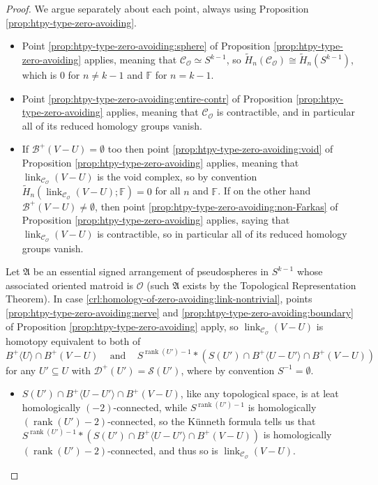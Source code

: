 \documentclass[a4paper,11pt,reqno, english]{amsart}
\theoremstyle{definition}
\theoremstyle{remark}
\DeclareMathOperator{\link}{\mathrm{link}}
\begin{document}
\begin{proof}
    We argue separately about each point, always using Proposition \ref{prop:htpy-type-zero-avoiding}.
    \begin{itemize}
        \item[\ref{crl:homology-of-zero-avoiding:complex-sphere}] Point \ref{prop:htpy-type-zero-avoiding:sphere} of Proposition \ref{prop:htpy-type-zero-avoiding} applies, meaning that $\mathscr{C}_\mathscr{O}\simeq S^{k-1}$, so $\tilde{H}_n(\mathscr{C}_\mathscr{O})\cong\tilde{H}_n(S^{k-1})$, which is $0$ for $n\neq k-1$ and $\mathbb{F}$ for $n=k-1$.
        \item[\ref{crl:homology-of-zero-avoiding:complex-pt}] Point \ref{prop:htpy-type-zero-avoiding:entire-contr} of Proposition \ref{prop:htpy-type-zero-avoiding} applies, meaning that $\mathscr{C}_\mathscr{O}$ is contractible, and in particular all of its reduced homology groups vanish.
        \item[\ref{crl:homology-of-zero-avoiding:link-contr}] If $\mathscr{B}^+(V-U)=\emptyset$ too then point \ref{prop:htpy-type-zero-avoiding:void} of Proposition \ref{prop:htpy-type-zero-avoiding} applies, meaning that $\link_{\mathscr{C}_\mathscr{O}}(V-U)$ is the void complex, so by convention $\tilde{H}_n(\link_{\mathscr{C}_\mathscr{O}}(V-U);\mathbb{F})=0$ for all $n$ and $\mathbb{F}$. If on the other hand $\mathscr{B}^+(V-U)\neq\emptyset$, then point \ref{prop:htpy-type-zero-avoiding:non-Farkas} of Proposition \ref{prop:htpy-type-zero-avoiding} applies, saying that $\link_{\mathscr{C}_\mathscr{O}}(V-U)$ is contractible, so in particular all of its reduced homology groups vanish.
    \end{itemize}    
    Let $\mathfrak{A}$ be an essential signed arrangement of pseudospheres in $S^{k-1}$ whose associated oriented matroid is $\mathscr{O}$ (such $\mathfrak{A}$ exists by the Topological Representation Theorem). In case \ref{crl:homology-of-zero-avoiding:link-nontrivial}, points \ref{prop:htpy-type-zero-avoiding:nerve} and \ref{prop:htpy-type-zero-avoiding:boundary} of Proposition \ref{prop:htpy-type-zero-avoiding} apply, so $\link_{\mathscr{C}_\mathscr{O}}(V-U)$ is homotopy equivalent to both of 
    \[
        B^+\langle U\rangle\cap B^+(V-U)\;\;\;\text{~and~}\;\;\;
        S^{\operatorname{rank}(U')-1}*\left(S(U')\cap B^+\langle U-U'\rangle\cap B^+(V-U)\right)
    \]
    for any $U'\subseteq U$ with $\mathscr{D}^+(U')=\mathscr{S}(U')$, where by convention $S^{-1}=\emptyset$.
    \begin{itemize}
        \item[\ref{crl:homology-of-zero-avoiding:link-nontrivial:upper-bound}] $S(U')\cap B^+\langle U-U'\rangle\cap B^+(V-U)$, like any topological space, is at leat homologically $(-2)$-connected, while $S^{\operatorname{rank}(U')-1}$ is homologically $(\operatorname{rank}(U')-2)$-connected, so the K\"unneth formula tells us that $S^{\operatorname{rank}(U')-1}*\left(S(U')\cap B^+\langle U-U'\rangle\cap B^+(V-U)\right)$ is homologically $(\operatorname{rank}(U')-2)$-connected, and thus so is $\link_{\mathscr{C}_\mathscr{O}}(V-U)$.

\end{itemize}
\end{proof}
\end{document}
